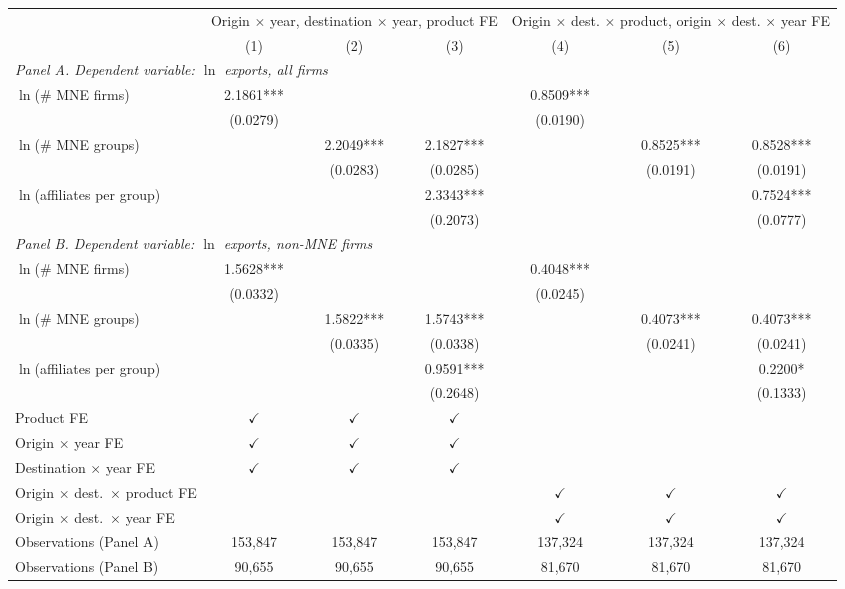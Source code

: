 \begin{tabular}{lcccccc} \hline
 & \multicolumn{3}{c}{Origin $\times$ year, destination $\times$ year, product FE} & \multicolumn{3}{c}{Origin $\times$ dest. $\times$ product, origin $\times$ dest. $\times$ year FE} \\
 & (1) & (2) & (3) & (4) & (5) & (6) \\ \hline
\multicolumn{7}{l}{\textit{Panel A. Dependent variable: $\ln$ exports, all firms}} \\
$\ln$(\# MNE firms) & 2.1861*** &  &  & 0.8509*** &  &  \\
 & (0.0279) &  &  & (0.0190) &  &  \\
$\ln$(\# MNE groups) &  & 2.2049*** & 2.1827*** &  & 0.8525*** & 0.8528*** \\
 &  & (0.0283) & (0.0285) &  & (0.0191) & (0.0191) \\
$\ln$(affiliates per group) &  &  & 2.3343*** &  &  & 0.7524*** \\
 &  &  & (0.2073) &  &  & (0.0777) \\
\midrule
\multicolumn{7}{l}{\textit{Panel B. Dependent variable: $\ln$ exports, non-MNE firms}} \\
$\ln$(\# MNE firms) & 1.5628*** &  &  & 0.4048*** &  &  \\
 & (0.0332) &  &  & (0.0245) &  &  \\
$\ln$(\# MNE groups) &  & 1.5822*** & 1.5743*** &  & 0.4073*** & 0.4073*** \\
 &  & (0.0335) & (0.0338) &  & (0.0241) & (0.0241) \\
$\ln$(affiliates per group) &  &  & 0.9591*** &  &  & 0.2200* \\
 &  &  & (0.2648) &  &  & (0.1333) \\
\hline
Product FE & $\checkmark$ & $\checkmark$ & $\checkmark$ &  &  &  \\
Origin $\times$ year FE & $\checkmark$ & $\checkmark$ & $\checkmark$ &  &  &  \\
Destination $\times$ year FE & $\checkmark$ & $\checkmark$ & $\checkmark$ &  &  &  \\
Origin $\times$ dest.\ $\times$ product FE &  &  &  & $\checkmark$ & $\checkmark$ & $\checkmark$ \\
Origin $\times$ dest.\ $\times$ year FE &  &  &  & $\checkmark$ & $\checkmark$ & $\checkmark$ \\
Observations (Panel A) & 153,847 & 153,847 & 153,847 & 137,324 & 137,324 & 137,324 \\
Observations (Panel B) & 90,655 & 90,655 & 90,655 & 81,670 & 81,670 & 81,670 \\
\hline
\end{tabular}
